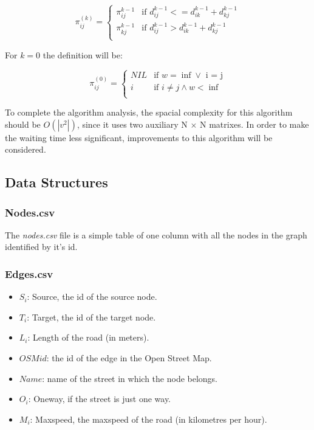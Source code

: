 \documentclass{article}
\begin{document}
    \begin{equation} 
      \pi_{ij}^{(k)} =
        \begin{cases}
          \pi_{ij}^{k-1} & \text{if } d_{ij}^{k-1} <= d_{ik}^{k-1} + d_{kj}^{k-1} \\
          \pi_{kj}^{k-1} & \text{if } d_{ij}^{k-1} > d_{ik}^{k-1} + d_{kj}^{k-1}\\
        \end{cases}       
    \end{equation}
    
    For $k = 0$ the definition will be: 
    
    \begin{equation} 
      \pi_{ij}^{(0)} =
        \begin{cases}
          NIL & \text{if } w = \inf \vee \text{ i = j}\\
          i & \text{if } i \neq j \wedge w < \inf\\
        \end{cases}      
    \end{equation}
    
    To complete the algorithm analysis, the spacial complexity for this algorithm should be $O(|v^2|)$, since it uses two auxiliary N $\times$ N matrixes. \newline 
    In order to make the waiting time less significant, improvements to this algorithm will be considered. 

\subsection*{Data Structures}
\subsubsection*{Nodes.csv}
        The \textit{nodes.csv} file is a simple table of one column with all the nodes in the graph identified by it's id. 

\subsubsection*{Edges.csv}
\begin{itemize}
    \item $S_i$: Source, the id of the source node. 
    \item $T_i$: Target, the id of the target node. 
    \item $L_i$: Length of the road (in meters).
    \item $OSM id$: the id of the edge in the Open Street Map. 
    \item $Name$: name of the street in which the node belongs.
    \item $O_i$: Oneway, if the street is just one way.
    \item $M_i$: Maxspeed, the maxspeed of the road (in kilometres per hour).
\end{itemize}
\end{document}
